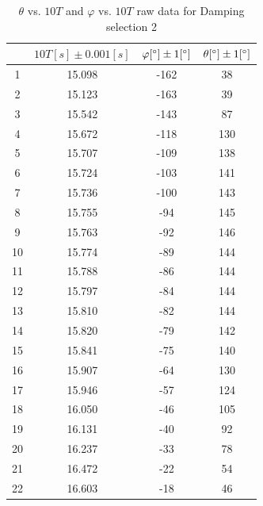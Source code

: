 \begin{table}[H]
\centering
\begin{tabular}{|c|c|c|c|}
\hline
& $10T [s] \pm 0.001 [s]$ &  $\varphi  [^\circ]  \pm 1 [^\circ]$ & $ \theta [^\circ] \pm 1 [^\circ]$ \\ \hline 

1  & 15.098 & -162  &  38   \\ \hline
2  & 15.123 & -163  &  39   \\ \hline
3  & 15.542 & -143  &  87   \\ \hline
4  & 15.672 & -118  &  130  \\ \hline
5  & 15.707 & -109  &  138  \\ \hline
6  & 15.724 & -103  &  141  \\ \hline
7  & 15.736 & -100  &  143  \\ \hline
8  & 15.755 & -94   &  145  \\ \hline
9  & 15.763 & -92   &  146  \\ \hline
10 & 15.774 & -89   &  144  \\ \hline
11 & 15.788 & -86   &  144  \\ \hline
12 & 15.797 & -84   &  144  \\ \hline
13 & 15.810 & -82   &  144  \\ \hline
14 & 15.820 & -79   &  142  \\ \hline
15 & 15.841 & -75   &  140  \\ \hline
16 & 15.907 & -64   &  130  \\ \hline
17 & 15.946 & -57   &  124  \\ \hline
18 & 16.050 & -46   &  105  \\ \hline
19 & 16.131 & -40   &  92   \\ \hline
20 & 16.237 & -33   &  78   \\ \hline
21 & 16.472 & -22   &  54   \\ \hline
22 & 16.603 & -18   &  46   \\ \hline
\end{tabular}    
\caption{$\theta$ vs. $10T$ and $\varphi$ vs. $10T$ raw data for Damping
  selection 2} 
\end{table}

